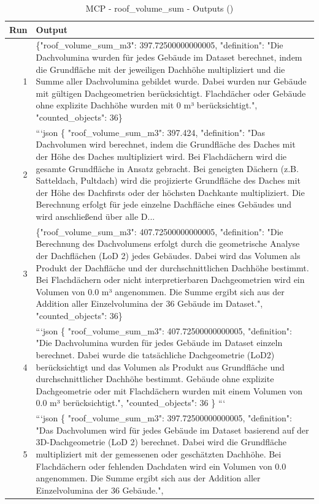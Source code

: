 \documentclass[a4paper,11pt]{article}
\begin{document}
\begin{table}[ht]
\centering
\scriptsize
\caption{MCP - roof\_volume\_sum - Outputs ()}
\label{tab:mcp\_roof\_volume\_sum\_outputs\_}
\begin{tabular}{r p{12cm}}
\hline
Run & Output \\
\hline
1 & \{"roof\_volume\_sum\_m3": 397.72500000000005, "definition": "Die Dachvolumina wurden für jedes Gebäude im Dataset berechnet, indem die Grundfläche mit der jeweiligen Dachhöhe multipliziert und die Summe aller Dachvolumina gebildet wurde. Dabei wurden nur Gebäude mit gültigen Dachgeometrien berücksichtigt. Flachdächer oder Gebäude ohne explizite Dachhöhe wurden mit 0 m³ berücksichtigt.", "counted\_objects": 36\} \\
2 & ```json
\{
  "roof\_volume\_sum\_m3": 397.424,
  "definition": "Das Dachvolumen wird berechnet, indem die Grundfläche des Daches mit der Höhe des Daches multipliziert wird. Bei Flachdächern wird die gesamte Grundfläche in Ansatz gebracht. Bei geneigten Dächern (z.B. Satteldach, Pultdach) wird die projizierte Grundfläche des Daches mit der Höhe des Dachfirsts oder der höchsten Dachkante multipliziert. Die Berechnung erfolgt für jede einzelne Dachfläche eines Gebäudes und wird anschließend über alle D... \\
3 & 
\{"roof\_volume\_sum\_m3": 407.72500000000005, "definition": "Die Berechnung des Dachvolumens erfolgt durch die geometrische Analyse der Dachflächen (LoD 2) jedes Gebäudes. Dabei wird das Volumen als Produkt der Dachfläche und der durchschnittlichen Dachhöhe bestimmt. Bei Flachdächern oder nicht interpretierbaren Dachgeometrien wird ein Volumen von 0.0 m³ angenommen. Die Summe ergibt sich aus der Addition aller Einzelvolumina der 36 Gebäude im Dataset.", "counted\_objects": 36\} \\
4 & 
```json
\{
  "roof\_volume\_sum\_m3": 407.72500000000005,
  "definition": "Die Dachvolumina wurden für jedes Gebäude im Dataset einzeln berechnet. Dabei wurde die tatsächliche Dachgeometrie (LoD2) berücksichtigt und das Volumen als Produkt aus Grundfläche und durchschnittlicher Dachhöhe bestimmt. Gebäude ohne explizite Dachgeometrie oder mit Flachdächern wurden mit einem Volumen von 0.0 m³ berücksichtigt.",
  "counted\_objects": 36
\}
``` \\
5 & ```json
\{
  "roof\_volume\_sum\_m3": 397.72500000000005,
  "definition": "Das Dachvolumen wird für jedes Gebäude im Dataset basierend auf der 3D-Dachgeometrie (LoD 2) berechnet. Dabei wird die Grundfläche multipliziert mit der gemessenen oder geschätzten Dachhöhe. Bei Flachdächern oder fehlenden Dachdaten wird ein Volumen von 0.0 angenommen. Die Summe ergibt sich aus der Addition aller Einzelvolumina der 36 Gebäude.",

\end{tabular}
\end{table}
\end{document}
